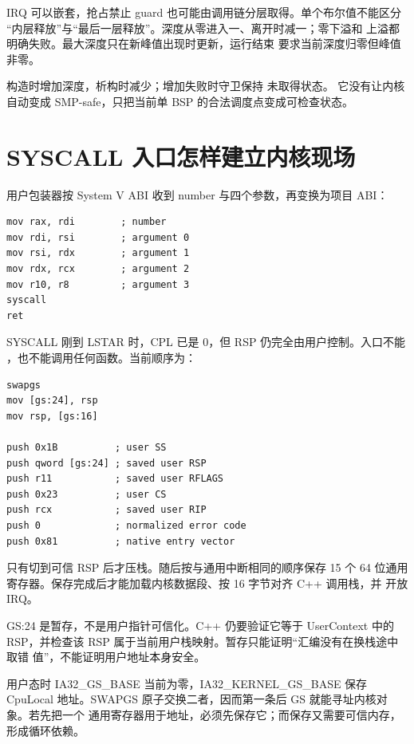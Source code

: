 IRQ 可以嵌套，抢占禁止 guard 也可能由调用链分层取得。单个布尔值不能区分
“内层释放”与“最后一层释放”。深度从零进入一、离开时减一；零下溢和
 上溢都明确失败。最大深度只在新峰值出现时更新，运行结束
要求当前深度归零但峰值非零。

 构造时增加深度，析构时减少；增加失败时守卫保持
未取得状态。
它没有让内核自动变成 SMP-safe，只把当前单 BSP 的合法调度点变成可检查状态。

\section{SYSCALL 入口怎样建立内核现场}
用户包装器按 System V ABI 收到 number 与四个参数，再变换为项目 ABI：

\begin{lstlisting}[language={[x86masm]Assembler},caption={用户侧最小原生包装}]
mov rax, rdi        ; number
mov rdi, rsi        ; argument 0
mov rsi, rdx        ; argument 1
mov rdx, rcx        ; argument 2
mov r10, r8         ; argument 3
syscall
ret
\end{lstlisting}

SYSCALL 刚到 LSTAR 时，CPL 已是 0，但 RSP 仍完全由用户控制。入口不能
，也不能调用任何函数。当前顺序为：

\begin{lstlisting}[language={[x86masm]Assembler},caption={可信换栈的关键前缀}]
swapgs
mov [gs:24], rsp
mov rsp, [gs:16]

push 0x1B          ; user SS
push qword [gs:24] ; saved user RSP
push r11           ; saved user RFLAGS
push 0x23          ; user CS
push rcx           ; saved user RIP
push 0             ; normalized error code
push 0x81          ; native entry vector
\end{lstlisting}

只有切到可信 RSP 后才压栈。随后按与通用中断相同的顺序保存 15 个 64 位通用
寄存器。保存完成后才能加载内核数据段、按 16 字节对齐 C++ 调用栈，并
 开放 IRQ。

\begin{contractbox}
GS:24 是暂存，不是用户指针可信化。C++ 仍要验证它等于 UserContext 中的
RSP，并检查该 RSP 属于当前用户栈映射。暂存只能证明“汇编没有在换栈途中取错
值”，不能证明用户地址本身安全。
\end{contractbox}

用户态时 IA32\_GS\_BASE 当前为零，IA32\_KERNEL\_GS\_BASE 保存 CpuLocal
地址。SWAPGS 原子交换二者，因而第一条后 GS 就能寻址内核对象。若先把一个
通用寄存器用于地址，必须先保存它；而保存又需要可信内存，形成循环依赖。

